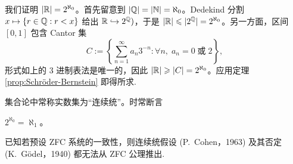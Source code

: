 \begin{example}[Cantor]\label{eg:continuum}
	我们证明 $|\mathbb{R}| = 2^{\aleph_0}$。首先留意到 $|\mathbb{Q}|=|\mathbb{N}|=\aleph_0$。Dedekind 分割 $x \mapsto \{r \in \mathbb{Q}: r < x \}$ 给出 $\mathbb{R} \hookrightarrow 2^{\mathbb{Q}})$，于是 $|\mathbb{R}| \leqslant |2^{\mathbb{Q}}|=2^{\aleph_0}$。另一方面，区间 $[0,1]$ 包含 Cantor 集
	\[ C := \left\{ \sum_{n=1}^\infty a_n 3^{-n}: \forall n,\; a_n = 0 \;\text{或}\; 2  \right\},\]
	形式如上的 $3$ 进制表法是唯一的，因此 $|\mathbb{R}| \geqslant |C| = 2^{\aleph_0}$。应用定理 \ref{prop:Schröder-Bernstein} 即得所求.
\end{example}

集合论中常称实数集为“连续统”。时常断言
\begin{hypothesis}[连续统假设]
	$2^{\aleph_0} = \aleph_1$。
\end{hypothesis}

已知若预设 ZFC 系统的一致性，则连续统假设 (P.\ Cohen，1963) 及其否定 (K.\ Gödel，1940) 都无法从 ZFC 公理推出.

